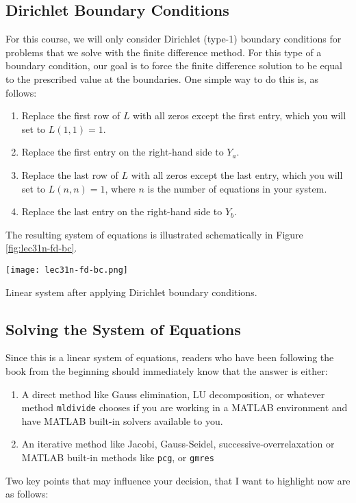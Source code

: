 \subsection{Dirichlet Boundary Conditions}
For this course, we will only consider Dirichlet (type-1) boundary conditions for problems that we solve with the finite difference method.  For this type of a boundary condition, our goal is to force the finite difference solution to be equal to the prescribed value at the boundaries.  One simple way to do this is, as follows:
\begin{enumerate}
\item Replace the first row of $L$ with all zeros except the first entry, which you will set to $L(1,1)=1$.  
\item Replace the first entry on the right-hand side to $Y_a$. 
\item Replace the last row of $L$ with all zeros except the last entry, which you will set to $L(n,n) = 1$, where $n$ is the number of equations in your system.
\item Replace the last entry on the right-hand side to $Y_b$.
\end{enumerate}
The resulting system of equations is illustrated schematically in Figure \ref{fig:lec31n-fd-bc}.
\begin{marginfigure}
\texttt{[image: lec31n-fd-bc.png]}
\caption{Linear system after applying Dirichlet boundary conditions.}
\label{fig:lec31n-fd-bc}
\end{marginfigure}

\subsection{Solving the System of Equations}
Since this is a linear system of equations, readers who have been following the book from the beginning should immediately know that the answer is either:
\begin{enumerate}
\item A direct method like Gauss elimination, LU decomposition, or whatever method \lstinline[style=myMatlab]{mldivide} chooses if you are working in a MATLAB environment and have MATLAB built-in solvers available to you.
\item An iterative method like Jacobi, Gauss-Seidel, successive-overrelaxation or MATLAB built-in methods like \lstinline[style=myMatlab]{pcg}, or \lstinline[style=myMatlab]{gmres}
\end{enumerate}
Two key points that may influence your decision, that I want to highlight now are as follows:

